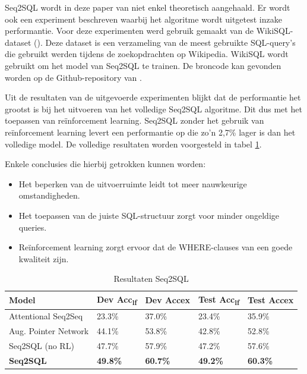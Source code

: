 Seq2SQL wordt in deze paper van \textcite{seq2sqlPaper} niet enkel theoretisch aangehaald. Er wordt ook een experiment beschreven waarbij het algoritme wordt uitgetest inzake performantie.  Voor deze experimenten werd gebruik gemaakt van de WikiSQL-dataset (\textcite{wikisql}). Deze dataset is een verzameling van de meest gebruikte SQL-query’s die gebruikt werden tijdens de zoekopdrachten op Wikipedia. WikiSQL wordt gebruikt om het model van Seq2SQL te trainen. De broncode kan gevonden worden op de Github-repository van \textcite{seq2sql}.

Uit de resultaten van de uitgevoerde experimenten blijkt dat de performantie het grootst is bij het uitvoeren van het volledige Seq2SQL algoritme. Dit dus met het toepassen van reïnforcement learning. Seq2SQL zonder het gebruik van reïnforcement learning levert een performantie op die zo’n 2,7\% lager is dan het volledige model. De volledige resultaten worden voorgesteld in tabel \ref{table:seq2sqltab}.

Enkele conclusies die hierbij getrokken kunnen worden:
\begin{itemize}
	\item Het beperken van de uitvoerruimte leidt tot meer nauwkeurige omstandigheden.
	\item Het toepassen van de juiste SQL-structuur zorgt voor minder ongeldige queries.
	\item Reïnforcement learning zorgt ervoor dat de WHERE-clauses van een goede kwaliteit zijn.
\end{itemize}

\begin{table}[ht]
	\centering
	\begin{tabular}{lllll}
		\hline
		Model                & Dev Acc\textsubscript{lf}       & Dev Accex       & Test Acc\textsubscript{lf}      & Test Accex      \\ \hline
		Attentional Seq2Seq  & 23.3\%          & 37.0\%          & 23.4\%          & 35.9\%          \\
		Aug. Pointer Network & 44.1\%          & 53.8\%          & 42.8\%          & 52.8\%          \\ \hline
		Seq2SQL (no RL)      & 47.7\%          & 57.9\%          & 47.2\%          & 57.6\%          \\
		\textbf{Seq2SQL}     & \textbf{49.8\%} & \textbf{60.7\%} & \textbf{49.2\%} & \textbf{60.3\%}
	\end{tabular}
	\caption{Resultaten Seq2SQL}
	\label{table:seq2sqltab}
\end{table} 

